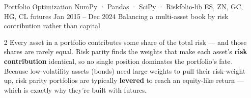 \documentclass{pyportfolios-note}
\begin{document}
\thispagestyle{notecover}





\notecard
  {Portfolio Optimization}
  {NumPy · Pandas · SciPy · Riskfolio-lib}
  {ES, ZN, GC, HG, CL futures}
  {Jan 2015 – Dec 2024}
  {Balancing a multi-asset book by risk contribution rather than capital}

\noteneedroom{150bp}

\begin{multicols}{2}
Every asset in a portfolio contributes some share of the total risk — and those
shares are rarely equal. Risk parity finds the weights that make each asset's
\textbf{risk contribution} identical, so no single position dominates the
portfolio's fate. Because low-volatility assets (bonds) need large weights to
pull their risk-weight up, risk parity portfolios are typically \textbf{levered}
to reach an equity-like return — which is exactly why they're built with
futures.
\end{multicols}

\noteneedroom{170bp}
\end{document}
